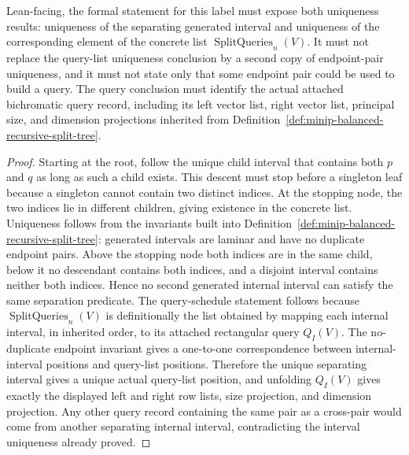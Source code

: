 \begin{lemma}
  Lean-facing, the formal statement for this label must expose both uniqueness
  results: uniqueness of the separating generated interval and uniqueness of
  the corresponding element of the concrete list
  $\operatorname{SplitQueries}_n(V)$.  It must not replace the query-list
  uniqueness conclusion by a second copy of endpoint-pair uniqueness, and it
  must not state only that some endpoint pair could be used to build a query.
  The query conclusion must identify the actual attached bichromatic query
  record, including its left vector list, right vector list, principal size,
  and dimension projections inherited from
  Definition~\ref{def:minip-balanced-recursive-split-tree}.
\end{lemma}
\begin{proof}
  Starting at the root, follow the unique child interval that contains both
  $p$ and $q$ as long as such a child exists.  This descent must stop before a
  singleton leaf because a singleton cannot contain two distinct indices.  At
  the stopping node, the two indices lie in different children, giving
  existence in the concrete list.  Uniqueness follows from the invariants built
  into Definition~\ref{def:minip-balanced-recursive-split-tree}: generated
  intervals are laminar and have no duplicate endpoint pairs.  Above the
  stopping node both indices are in the same child, below it no descendant
  contains both indices, and a disjoint interval contains neither both indices.
  Hence no second generated internal interval can satisfy the same separation
  predicate.
  The query-schedule statement follows because
  $\operatorname{SplitQueries}_n(V)$ is definitionally the list obtained by
  mapping each internal interval, in inherited order, to its attached
  rectangular query $Q_I(V)$.  The no-duplicate endpoint invariant gives a
  one-to-one correspondence between internal-interval positions and query-list
  positions.  Therefore the unique separating interval gives a unique actual
  query-list position, and unfolding $Q_I(V)$ gives exactly the displayed left
  and right row lists, size projection, and dimension projection.  Any other
  query record containing the same pair as a cross-pair would come from another
  separating internal interval, contradicting the interval uniqueness already
  proved.
\end{proof}

